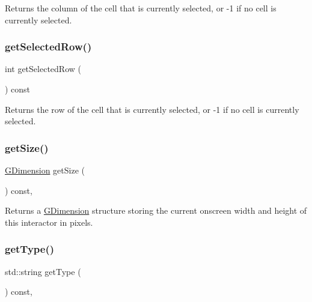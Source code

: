 Returns the column of the cell that is currently selected, or -\/1 if no cell is currently selected. 

\mbox{\label{classsgl_1_1GTable_adeb0b39683825191a8216d6cc3ca5072}} 
\subsubsection{\texorpdfstring{get\+Selected\+Row()}{getSelectedRow()}}
{\footnotesize\ttfamily int get\+Selected\+Row (\begin{DoxyParamCaption}{ }\end{DoxyParamCaption}) const\hspace{0.3cm}{\ttfamily [virtual]}}



Returns the row of the cell that is currently selected, or -\/1 if no cell is currently selected. 

\mbox{\label{classsgl_1_1GInteractor_a7b4eec96a2bdc6420695d5796a78eea9}} 
\subsubsection{\texorpdfstring{get\+Size()}{getSize()}}
{\footnotesize\ttfamily \mbox{\hyperlink{structsgl_1_1GDimension}{G\+Dimension}} get\+Size (\begin{DoxyParamCaption}{ }\end{DoxyParamCaption}) const\hspace{0.3cm}{\ttfamily [virtual]}, {\ttfamily [inherited]}}



Returns a \mbox{\hyperlink{structsgl_1_1GDimension}{G\+Dimension}} structure storing the current onscreen width and height of this interactor in pixels. 

\mbox{\label{classsgl_1_1GTable_a9b72ede4ee8520f987a0c01e30654814}} 
\subsubsection{\texorpdfstring{get\+Type()}{getType()}}
{\footnotesize\ttfamily std\+::string get\+Type (\begin{DoxyParamCaption}{ }\end{DoxyParamCaption}) const\hspace{0.3cm}{\ttfamily [override]}, {\ttfamily [virtual]}}



